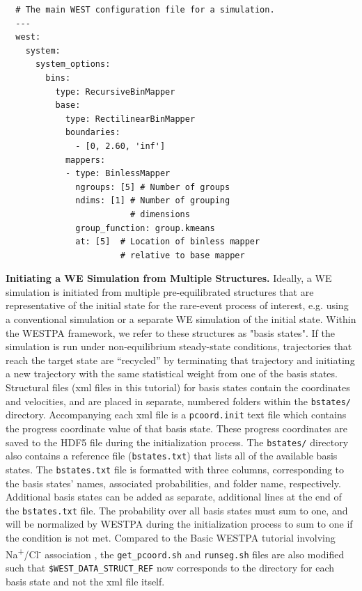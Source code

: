 \begin{verbatim}
  # The main WEST configuration file for a simulation.
  ---
  west:
    system:
      system_options:
        bins:
          type: RecursiveBinMapper
          base:
            type: RectilinearBinMapper
            boundaries:
              - [0, 2.60, 'inf']
            mappers:
            - type: BinlessMapper
              ngroups: [5] # Number of groups
              ndims: [1] # Number of grouping 
                         # dimensions
              group_function: group.kmeans
              at: [5]  # Location of binless mapper
                       # relative to base mapper
\end{verbatim} 
\pagebreak

\textbf{Initiating a WE Simulation from Multiple Structures.} Ideally, a WE simulation is initiated from multiple pre-equilibrated structures that are representative of the initial state for the rare-event process of interest, e.g. using a conventional simulation or a separate WE simulation of the initial state.
Within the WESTPA framework, we refer to these structures as "basis states". 
If the simulation is run under non-equilibrium steady-state conditions, trajectories that reach the target state are “recycled” by terminating that trajectory and initiating a new trajectory with the same statistical weight from one of the basis states. 
Structural files (xml files in this tutorial) for basis states contain the coordinates and velocities, and are placed in separate, numbered folders within the \verb|bstates/| directory. 
Accompanying each xml file is a \verb|pcoord.init| text file which contains the progress coordinate value of that basis state. 
These progress coordinates are saved to the HDF5 file during the initialization process. 
The \verb|bstates/| directory also contains a reference file (\verb|bstates.txt|) that lists all of the available basis states. 
The \verb|bstates.txt| file is formatted with three columns, corresponding to the basis states’ names, associated probabilities, and folder name, respectively.
Additional basis states can be added as separate, additional lines at the end of the \verb|bstates.txt| file. 
The probability over all basis states must sum to one, and will be normalized by WESTPA during the initialization process to sum to one if the condition is not met.
Compared to the Basic WESTPA tutorial involving Na\textsuperscript{+}/Cl\textsuperscript{-} association \citep{bogetti_suite_2019}, the \verb|get_pcoord.sh| and \verb|runseg.sh| files are also modified such that \verb|$WEST_DATA_STRUCT_REF| now corresponds to the directory for each basis state and not the xml file itself.

